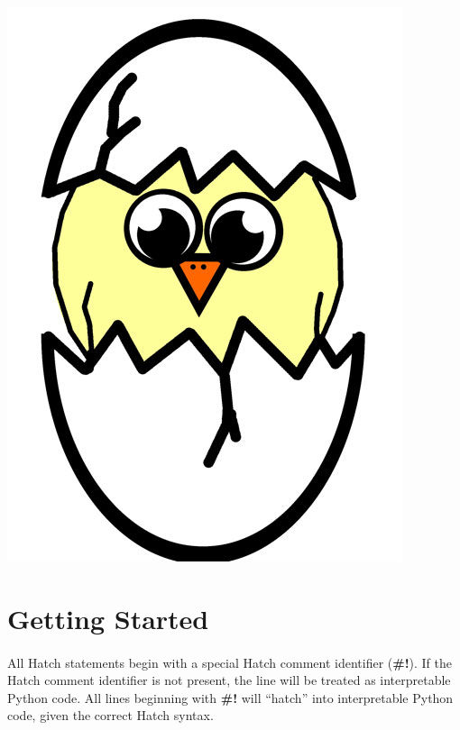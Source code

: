 \documentclass[12pt]{article}
\begin{document}
\maketitle
\begin{center}
\includegraphics[scale=0.45]{../images/hatchchick.JPG}
\end{center}
\pagebreak

\section{Getting Started}
\paragraph{} All Hatch statements begin with a special Hatch comment identifier (\textbf{\#!}).  If the Hatch comment identifier is not present, the line will be treated as interpretable Python code.  All lines beginning with \textbf{\#!} will ``hatch'' into interpretable Python code, given the correct Hatch syntax.
\end{document}
